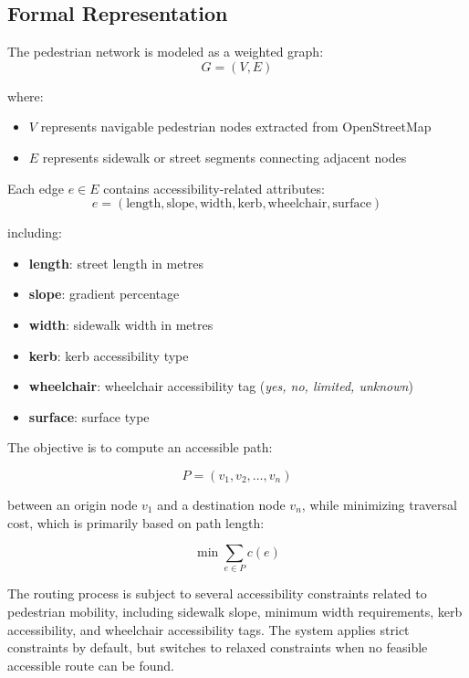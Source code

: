 \documentclass[letterpaper]{article} %
\begin{document}
\subsection{Formal Representation}

The pedestrian network is modeled as a weighted graph:
\[
G = (V,E)
\]

where:
\begin{itemize}

    \item \(V\) represents navigable pedestrian nodes extracted from OpenStreetMap
    
    \item \(E\) represents sidewalk or street segments connecting adjacent nodes
    
\end{itemize}

Each edge \(e \in E\) contains accessibility-related attributes:
\[
e = (\text{length}, \text{slope}, \text{width}, \text{kerb}, \text{wheelchair}, \text{surface})
\]

including:
\begin{itemize}
    \item \textbf{length}: street length in metres
    \item \textbf{slope}: gradient percentage
    \item \textbf{width}: sidewalk width in metres
    \item \textbf{kerb}: kerb accessibility type
    \item \textbf{wheelchair}: wheelchair accessibility tag (\textit{yes, no, limited, unknown})
    \item \textbf{surface}: surface type
\end{itemize}

The objective is to compute an accessible path:

\[
P = (v_1,v_2,\dots,v_n)
\]

between an origin node \(v_1\) and a destination node \(v_n\), while minimizing traversal cost, which is primarily based on path length:

\[
\min \sum_{e \in P} c(e)
\]

The routing process is subject to several accessibility constraints related to pedestrian mobility, including sidewalk slope, minimum width requirements, kerb accessibility, and wheelchair accessibility tags. The system applies strict constraints by default, but switches to relaxed constraints when no feasible accessible route can be found.
\end{document}
